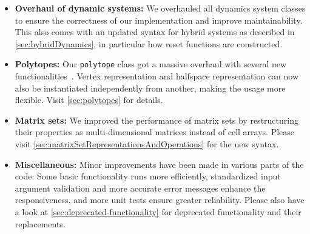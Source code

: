 \begin{itemize}
	\item \textbf{Overhaul of dynamic systems:}
		We overhauled all dynamics system classes to ensure the correctness of our implementation and improve maintainability.
		This also comes with an updated syntax for hybrid systems as described in \cref{sec:hybridDynamics},
		in particular how reset functions are constructed.

	\item \textbf{Polytopes:}
	Our \texttt{polytope} class got a massive overhaul with several new functionalities~\cite{Wetzlinger2024a}.
	Vertex representation and halfspace representation can now also be instantiated independently from another,
	making the usage more flexible. Visit \cref{sec:polytopes} for details.

	\item \textbf{Matrix sets:}
		We improved the performance of matrix sets by restructuring their properties as multi-dimensional matrices instead of cell arrays.
		Please visit \cref{sec:matrixSetRepresentationsAndOperations} for the new syntax.

	\item \textbf{Miscellaneous:}
 		Minor improvements have been made in various parts of the code:
		Some basic functionality runs more efficiently,
		standardized input argument validation and more accurate error messages enhance the responsiveness,
		and more unit tests ensure greater reliability.
		Please also have a look at \cref{sec:deprecated-functionality} for deprecated functionality and their replacements.


\end{itemize}
